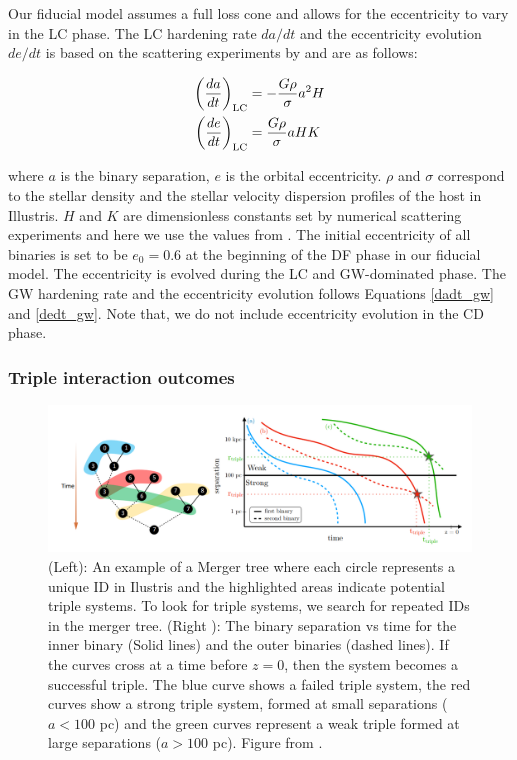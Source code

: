 \documentclass[11pt, letterpaper]{article}
\begin{document}
Our fiducial model assumes a full loss cone and allows for the eccentricity to vary in the LC phase. The LC hardening rate $da/dt$ and the eccentricity evolution $de/dt$ is based on the scattering experiments by \citet{Sesana_2006} and are as follows:


\begin{align}
    \left( \frac{da}{dt} \right)_{\rm LC} &= - \frac{G \rho}{\sigma} a^2 H\\
    \left( \frac{de}{dt} \right)_{\rm LC} &= \frac{G \rho}{\sigma} a H K
    \label{dadt_lc}
\end{align}

where $a$ is the binary separation, $e$ is the orbital eccentricity. $\rho$ and $\sigma$ correspond to the stellar density and the stellar velocity dispersion profiles of the host in Illustris. $H$ and $K$ are dimensionless constants set by numerical scattering experiments and here we use the values from \citet{Sesana_2006}. The initial eccentricity of all binaries is set to be $e_{0} = 0.6$ at the beginning of the DF phase in our fiducial model. The eccentricity is evolved during the LC and GW-dominated phase. The GW hardening rate and the eccentricity evolution follows Equations \ref{dadt_gw} and \ref{dedt_gw}. Note that, we do not include eccentricity evolution in the CD phase. 

 \subsubsection{Triple interaction outcomes}
\label{sec:triple-outcomes}
\begin{figure}[!htb]
    \centering
    \includegraphics[width=0.9\linewidth]{fig/triple-MBH-identification.png}
    \caption{(Left): An example of a Merger tree where each circle represents a unique ID in Ilustris and the highlighted areas indicate potential triple systems. To look for triple systems, we search for repeated IDs in the merger tree. (Right
    ): The binary separation vs time for the inner binary (Solid lines) and the outer binaries (dashed lines). If the curves cross at a time before $z=0$, then the system becomes a successful triple. The blue curve shows a failed triple system, the red curves show a strong triple system, formed at small separations ($a <100$ pc) and the green curves represent a weak triple formed at large separations ($a>100$ pc). Figure from \cite{sayeb_mbh_2023}.}
    \label{fig:trip-identify}
\end{figure}
\end{document}
